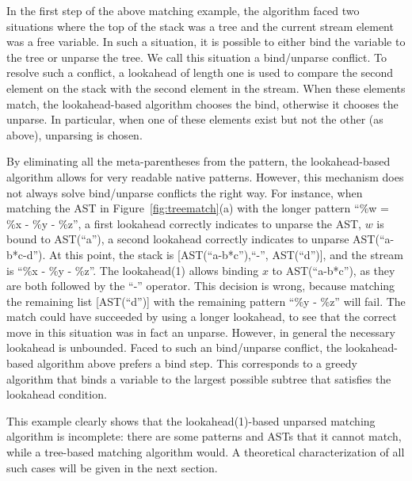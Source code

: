 \documentclass{sigplanconf}
\begin{document}
In the first step of the above matching example, the algorithm faced
two situations where the top of the stack was a tree and the current
stream element was a free variable. In such a situation, it is possible
to either bind the variable to the tree or unparse the tree. We call
this situation a bind/unparse conflict. To resolve such a conflict, a
lookahead of length one is used to compare the second element on the
stack with the second element in the stream. When these elements
match, the lookahead-based algorithm chooses the bind, otherwise it
chooses the unparse. In particular, when one of these elements exist
but not the other (as above), unparsing is chosen.

By eliminating all the meta-parentheses from the pattern, the
lookahead-based algorithm allows for very readable native patterns.
However, this mechanism does not always solve bind/unparse conflicts
the right way. For instance, when matching the AST in
Figure~\ref{fig:treematch}(a) with the longer pattern ``\%w = \%x -
\%y - \%z'', a first lookahead correctly indicates to unparse the AST,
$w$ is bound to AST(``a''), a second lookahead correctly indicates to
unparse AST(``a-b*c-d''). At this point, the stack is
[AST(``a-b*c''),``-'', AST(``d'')], and the stream is ``\%x - \%y -
\%z''. The lookahead(1) allows binding $x$ to AST(``a-b*c''), as they
are both followed by the ``-'' operator. This decision is wrong,
because matching the remaining list [AST(``d'')] with the remaining
pattern ``\%y - \%z'' will fail. The match could have succeeded by
using a longer lookahead, to see that the correct move in this
situation was in fact an unparse. However, in general the necessary
lookahead is unbounded. Faced to such an bind/unparse conflict, the
lookahead-based algorithm above prefers a bind step. This corresponds
to a greedy algorithm that binds a variable to the largest possible
subtree that satisfies the lookahead condition.

This example clearly shows that the lookahead(1)-based unparsed
matching algorithm is incomplete: there are some patterns and ASTs
that it cannot match, while a tree-based matching algorithm would. A
theoretical characterization of all such cases will be given in the
next section.

\end{document}
